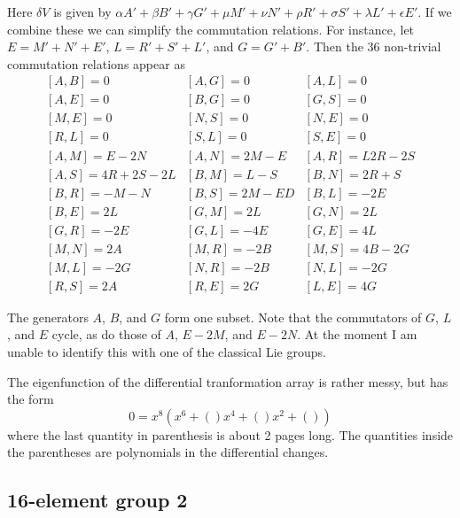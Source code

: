 \documentclass[12pt]{article}
\begin{document}
 Here $\delta V$ is given by 
$\alpha A' + \beta B' + \gamma G' + \mu M' + \nu N' + \rho R' + \sigma S' +
\lambda L' + \epsilon E'$.  If we combine these we can simplify the
commutation relations.  For instance, let $E = M' + N' + E'$, $L = R'+S'+L'$,
and $G = G' + B'$.  Then the 36 non-trivial commutation relations appear
as
\begin{eqnarray*}
\left[ A,B \right] = 0 & \left[ A,G \right] = 0 & \left[ A,L \right] = 0\\
\left[ A,E \right] = 0 & \left[ B,G \right] = 0 & \left[ G,S \right] = 0\\
\left[ M,E \right] = 0 & \left[ N,S \right] = 0 & \left[ N,E \right] = 0\\
\left[ R,L \right] = 0 & \left[ S,L \right] = 0 & \left[ S,E \right] = 0\\
\left[ A,M \right] = E-2N & \left[ A,N \right] = 2M-E & \left[ A,R \right] = L2R-2S \\
\left[ A,S \right] = 4R+2S-2L & \left[ B,M \right] = L-S & \left[ B,N \right] = 2R+S\\
\left[ B,R \right] = -M-N & \left[ B,S \right] = 2M-ED & \left[ B,L \right] = -2E\\
\left[ B,E \right] = 2L & \left[ G,M \right] = 2L & \left[ G,N \right] = 2L\\
\left[ G,R \right] = -2E & \left[ G,L \right] = -4E & \left[ G,E \right] = 4L\\
\left[ M,N \right] = 2A & \left[ M,R \right] = -2B & \left[ M,S \right] = 4B-2G\\
\left[ M,L \right] = -2G & \left[ N,R \right] = -2B & \left[ N,L \right] = -2G\\
\left[ R,S \right] = 2A & \left[ R,E \right] = 2G & \left[ L,E \right] = 4G
\end{eqnarray*}

 The generators $A$, $B$, and $G$ form one subset.  Note that the commutators
of $G$, $L$, and $E$ cycle, as do those of $A$, $E-2M$, and $E-2N$.  At the
moment I am unable to identify this with one of the classical Lie groups.

 The eigenfunction of the differential tranformation array is rather
messy, but has the form
$$
0 = x^{8} \left( x^6 + \left( \right) x^4 + \left( \right) x^2 +
\left( \right) \right)
$$
where the last quantity in parenthesis is about 2 pages long.  The
quantities inside the parentheses are polynomials in the differential
changes.

\subsection{16-element group 2}
\end{document}
